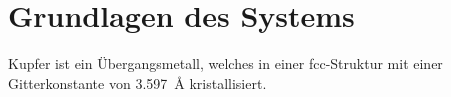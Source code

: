 \chapter{Grundlagen des Systems}

Kupfer ist ein Übergangsmetall, welches in einer fcc-Struktur mit einer Gitterkonstante von \SI{3.597}{\angstrom} kristallisiert.
